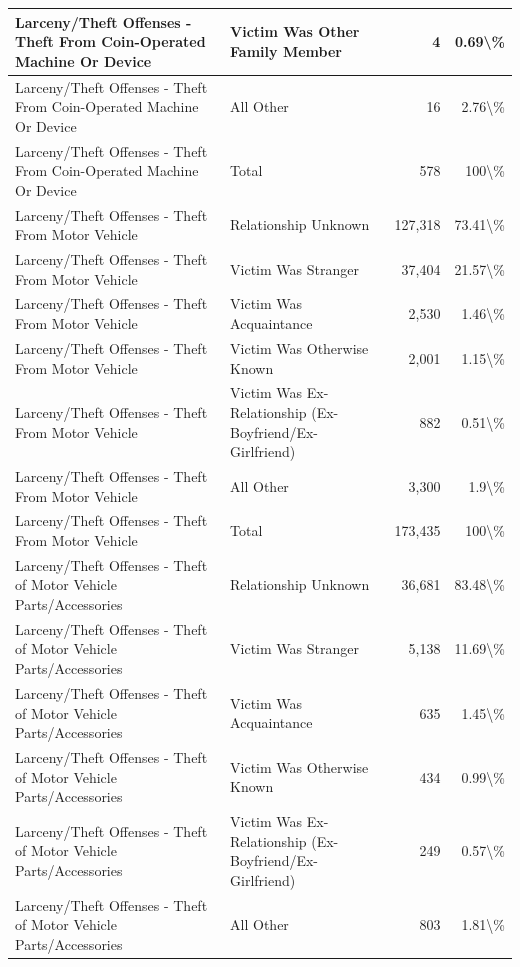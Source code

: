 \documentclass[
]{krantz}
\begin{document}
\begin{longtable}[t]{l|l|r|r}
\hline
Larceny/Theft Offenses - Theft From Coin-Operated Machine Or Device & Victim Was Other Family Member & 4 & 0.69\textbackslash{}\%\\
\hline
Larceny/Theft Offenses - Theft From Coin-Operated Machine Or Device & All Other & 16 & 2.76\textbackslash{}\%\\
\hline
Larceny/Theft Offenses - Theft From Coin-Operated Machine Or Device & Total & 578 & 100\textbackslash{}\%\\
\hline
Larceny/Theft Offenses - Theft From Motor Vehicle & Relationship Unknown & 127,318 & 73.41\textbackslash{}\%\\
\hline
Larceny/Theft Offenses - Theft From Motor Vehicle & Victim Was Stranger & 37,404 & 21.57\textbackslash{}\%\\
\hline
Larceny/Theft Offenses - Theft From Motor Vehicle & Victim Was Acquaintance & 2,530 & 1.46\textbackslash{}\%\\
\hline
Larceny/Theft Offenses - Theft From Motor Vehicle & Victim Was Otherwise Known & 2,001 & 1.15\textbackslash{}\%\\
\hline
Larceny/Theft Offenses - Theft From Motor Vehicle & Victim Was Ex-Relationship (Ex-Boyfriend/Ex-Girlfriend) & 882 & 0.51\textbackslash{}\%\\
\hline
Larceny/Theft Offenses - Theft From Motor Vehicle & All Other & 3,300 & 1.9\textbackslash{}\%\\
\hline
Larceny/Theft Offenses - Theft From Motor Vehicle & Total & 173,435 & 100\textbackslash{}\%\\
\hline
Larceny/Theft Offenses - Theft of Motor Vehicle Parts/Accessories & Relationship Unknown & 36,681 & 83.48\textbackslash{}\%\\
\hline
Larceny/Theft Offenses - Theft of Motor Vehicle Parts/Accessories & Victim Was Stranger & 5,138 & 11.69\textbackslash{}\%\\
\hline
Larceny/Theft Offenses - Theft of Motor Vehicle Parts/Accessories & Victim Was Acquaintance & 635 & 1.45\textbackslash{}\%\\
\hline
Larceny/Theft Offenses - Theft of Motor Vehicle Parts/Accessories & Victim Was Otherwise Known & 434 & 0.99\textbackslash{}\%\\
\hline
Larceny/Theft Offenses - Theft of Motor Vehicle Parts/Accessories & Victim Was Ex-Relationship (Ex-Boyfriend/Ex-Girlfriend) & 249 & 0.57\textbackslash{}\%\\
\hline
Larceny/Theft Offenses - Theft of Motor Vehicle Parts/Accessories & All Other & 803 & 1.81\textbackslash{}\%\\

\end{longtable}
\end{document}
